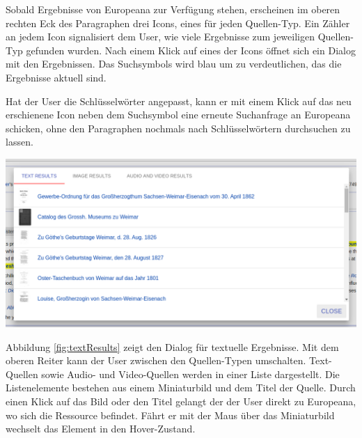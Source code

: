  Sobald Ergebnisse von Europeana zur Verfügung stehen, erscheinen im oberen rechten Eck des Paragraphen drei Icons, eines für jeden Quellen-Typ. Ein Zähler an jedem Icon signalisiert dem User, wie viele Ergebnisse zum jeweiligen Quellen-Typ gefunden wurden. Nach einem Klick auf eines der Icons öffnet sich ein Dialog mit den Ergebnissen. Das Suchsymbols wird blau um zu verdeutlichen, das die Ergebnisse aktuell sind.

 Hat der User die Schlüsselwörter angepasst, kann er mit einem Klick auf das neu erschienene Icon neben dem Suchsymbol eine erneute Suchanfrage an Europeana schicken, ohne den Paragraphen nochmals nach Schlüsselwörtern durchsuchen zu lassen.

 \begin{minipage}{\linewidth}
	\centering
	\vspace*{0.5cm}
	\includegraphics[width=\linewidth]{Bilder/app-screenshots/text-results.png}
	\label{fig:textResults}
	\vspace*{0.5cm}
 \end{minipage}

 Abbildung \ref{fig:textResults} zeigt den Dialog für textuelle Ergebnisse. Mit dem oberen Reiter kann der User zwischen den Quellen-Typen umschalten. Text-Quellen sowie Audio- und Video-Quellen werden in einer Liste dargestellt. Die Listenelemente bestehen aus einem Miniaturbild und dem Titel der Quelle. Durch einen Klick auf das Bild oder den Titel gelangt der der User direkt zu Europeana, wo sich die Ressource befindet. Fährt er mit der Maus über das Miniaturbild wechselt das Element in den Hover-Zustand. 

